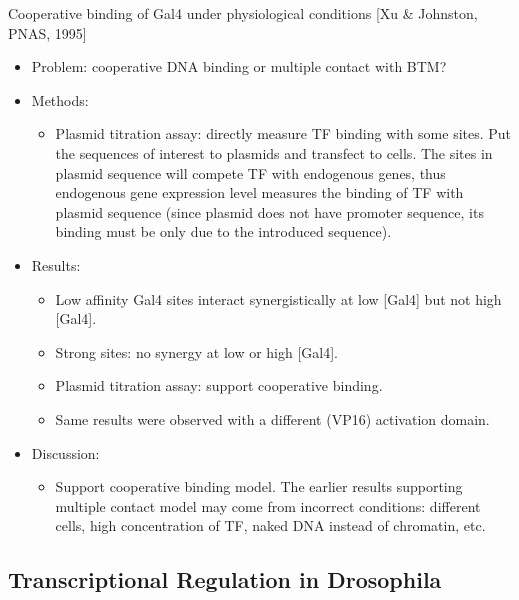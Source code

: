 \documentclass{report}
\begin{document}
Cooperative binding of Gal4 under physiological conditions [Xu \& Johnston, PNAS, 1995]
\begin{itemize}
	\item Problem: cooperative DNA binding or multiple contact with BTM? 
	
	\item Methods: 
	\begin{itemize}
		\item Plasmid titration assay: directly measure TF binding with some sites. Put the sequences of interest to plasmids and transfect to cells. The sites in plasmid sequence will compete TF with endogenous genes, thus endogenous gene expression level measures the binding of TF with plasmid sequence (since plasmid does not have promoter sequence, its binding must be only due to the introduced sequence). 
	\end{itemize}
	
	\item Results: 
	\begin{itemize}
		\item Low affinity Gal4 sites interact synergistically at low [Gal4] but not high [Gal4]. 
		\item Strong sites: no synergy at low or high [Gal4]. 
		\item Plasmid titration assay: support cooperative binding. 
		\item Same results were observed with a different (VP16) activation domain. 
	\end{itemize}
	
	\item Discussion: 
	\begin{itemize}
		\item Support cooperative binding model. The earlier results supporting multiple contact model may come from incorrect conditions: different cells, high concentration of TF, naked DNA instead of chromatin, etc. 
	\end{itemize}
\end{itemize}

\subsection{Transcriptional Regulation in Drosophila}
\end{document}
